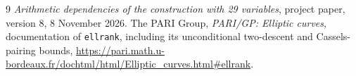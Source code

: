 \documentclass[11pt,a4paper]{article}
\theoremstyle{definition}\newtheorem{definition}[theorem]{Definition}
\begin{document}
\begin{thebibliography}{9}\small
{}
\emph{Arithmetic dependencies of the construction with 29 variables},
project paper, version 8, 8 November 2026.
The PARI Group, \emph{PARI/GP: Elliptic curves}, documentation of
\texttt{ellrank}, including its unconditional two-descent and
Cassels-pairing bounds,
\url{https://pari.math.u-bordeaux.fr/dochtml/html/Elliptic_curves.html\#ellrank}.
\end{thebibliography}
\end{document}
